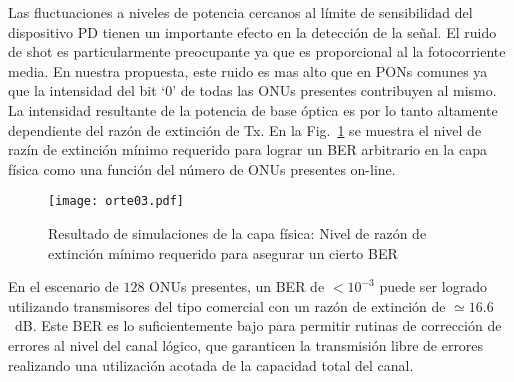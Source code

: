 Las fluctuaciones a niveles de potencia cercanos al límite de sensibilidad del dispositivo PD tienen un importante efecto en la detección de la señal.
El ruido de shot es particularmente preocupante ya que es proporcional al la fotocorriente media. En nuestra propuesta, este ruido es mas alto que en PONs comunes ya que la intensidad del bit `0' de todas las ONUs presentes contribuyen al mismo.
La intensidad resultante de la potencia de base óptica es por lo tanto altamente dependiente del razón de extinción de Tx.
En la Fig.~\ref{sim:optical} se muestra el nivel de razín de extinción mínimo requerido para lograr un BER arbitrario en la capa física como una función del número de ONUs presentes on-line.
\begin{figure}[!t]
    \centering
      \texttt{[image: orte03.pdf]}
      \caption{Resultado de simulaciones de la capa física: Nivel de razón de extinción mínimo requerido para asegurar un cierto BER}
      \label{sim:optical}
\end{figure}
En el escenario de $128$ ONUs presentes, un BER de $<10^{-3}$ puede ser logrado utilizando transmisores del tipo comercial con un razón de extinción de $\simeq16.6$~dB.
Este BER es lo suficientemente bajo para permitir rutinas de corrección de errores al nivel del canal lógico, que garanticen la transmisión libre de errores realizando una utilización acotada de la capacidad total del canal.
